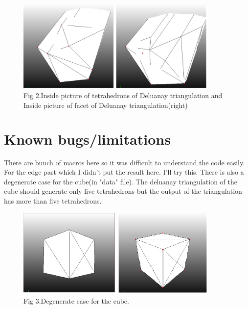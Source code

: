 \documentclass[11pt]{article}
\begin{document}
\begin{figure}[h]
  \includegraphics[width=100mm]{tetr.jpg}\\
  Fig 2.Inside picture of tetrahedrons of Deluanay triangulation and Inside picture of facet of Deluanay triangulation(right)
\end{figure}


\section{Known bugs/limitations}
There are bunch of macros here so it was difficult to understand the code easily.
For the edge part which I didn't put the result here. I'll try this. There is also a degenerate case for the cube(in "data" file). The deluanay triangulation of the cube should generate only five tetrahedrons but the output of the triangulation has more than five tetrahedrons. 

\begin{figure}[h]
  \includegraphics[width=100mm]{degen.jpg}\\
  Fig 3.Degenerate case for the cube.
\end{figure}



\end{document}
